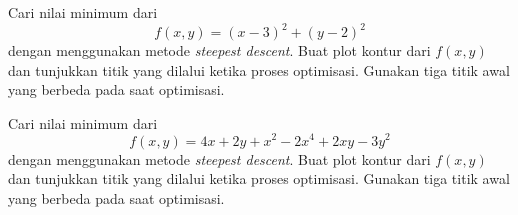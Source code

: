 \begin{soal}
Cari nilai minimum dari
\begin{equation*}
f(x,y) = (x - 3)^2 + (y - 2)^2
\end{equation*}
dengan menggunakan metode \textit{steepest descent}. Buat plot kontur
dari $f(x,y)$ dan tunjukkan titik yang dilalui ketika proses optimisasi.
Gunakan tiga titik awal yang berbeda pada saat optimisasi.
\end{soal}


\begin{soal}
Cari nilai minimum dari
\begin{equation*}
f(x,y) = 4x + 2y + x^2 - 2x^4 + 2xy - 3y^2
\end{equation*}
dengan menggunakan metode \textit{steepest descent}.
Buat plot kontur
dari $f(x,y)$ dan tunjukkan titik yang dilalui ketika proses optimisasi.
Gunakan tiga titik awal yang berbeda pada saat optimisasi.
\end{soal}